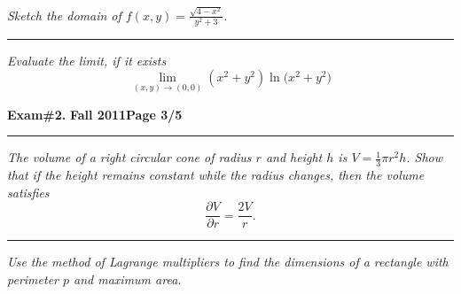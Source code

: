 \documentclass[12pt]{article}
\begin{document}
\bigskip
{\problem[15 pts] \em  Sketch the domain of $f(x,y)=\displaystyle{\frac{\sqrt{4-x^2}}{y^2+3}}$.}
\vspace{11.5cm}
\hrule
{\problem[15 pts] \em Evaluate the limit, if it exists}
\begin{equation*}
\lim_{(x,y) \to (0,0)} (x^2+y^2) \ln \big( x^2 + y^2 \big)
\end{equation*}
\vspace{6.5cm}
\begin{flushright}
\end{flushright}
\newpage

\hfill{\large\bf Exam\#2.}\hfill{\large\bf
  Fall 2011}\hfill{\large\bf Page 3/5}\hrule

\bigskip
{\problem[15 pts] \em The volume of a right circular cone of radius $r$ and height $h$ is $V = \tfrac{1}{3}\pi r^2h$.  Show that if the height remains constant while the radius changes, then the volume satisfies}
\begin{equation*}
\frac{\partial V}{\partial r} = \frac{2V}{r}.
\end{equation*}
\vspace{10.5cm}
\hrule
{\problem[10 pts] \em Use the method of Lagrange multipliers to find the
dimensions of a rectangle with perimeter $p$ and maximum area.}
\vspace{4.5cm}
\begin{flushright}
\end{flushright}
\newpage
\end{document}
